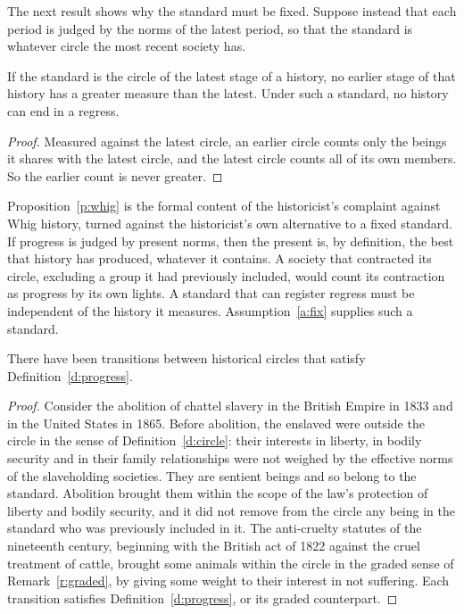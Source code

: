 \documentclass{situationist-preprint}
\begin{document}
The next result shows why the standard must be fixed. Suppose instead that each period is judged by the norms of the latest period, so that the standard is whatever circle the most recent society has.

\begin{proposition}\label{p:whig}
If the standard is the circle of the latest stage of a history, no earlier stage of that history has a greater measure than the latest. Under such a standard, no history can end in a regress.
\end{proposition}

\begin{proof}
Measured against the latest circle, an earlier circle counts only the beings it shares with the latest circle, and the latest circle counts all of its own members. So the earlier count is never greater.
\end{proof}

Proposition~\ref{p:whig} is the formal content of the historicist's complaint against Whig history, turned against the historicist's own alternative to a fixed standard. If progress is judged by present norms, then the present is, by definition, the best that history has produced, whatever it contains. A society that contracted its circle, excluding a group it had previously included, would count its contraction as progress by its own lights. A standard that can register regress must be independent of the history it measures. Assumption~\ref{a:fix} supplies such a standard.

\begin{theorem}\label{t:real}
There have been transitions between historical circles that satisfy Definition~\ref{d:progress}.
\end{theorem}

\begin{proof}
Consider the abolition of chattel slavery in the British Empire in 1833 and in the United States in 1865. Before abolition, the enslaved were outside the circle in the sense of Definition~\ref{d:circle}: their interests in liberty, in bodily security and in their family relationships were not weighed by the effective norms of the slaveholding societies. They are sentient beings and so belong to the standard. Abolition brought them within the scope of the law's protection of liberty and bodily security, and it did not remove from the circle any being in the standard who was previously included in it. The anti-cruelty statutes of the nineteenth century, beginning with the British act of 1822 against the cruel treatment of cattle, brought some animals within the circle in the graded sense of Remark~\ref{r:graded}, by giving some weight to their interest in not suffering. Each transition satisfies Definition~\ref{d:progress}, or its graded counterpart.
\end{proof}
\end{document}
